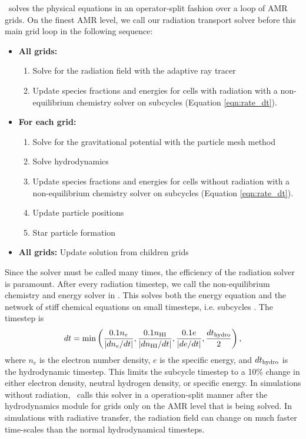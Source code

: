 \documentclass[useAMS,usenatbib]{mn2e}
\begin{document}
\enzo~solves the physical equations in an operator-split fashion over
a loop of AMR grids.  On the finest AMR level, we call our radiation
transport solver before this main grid loop in the following sequence:
\begin{itemize}
\item \textbf{All grids:}
  \begin{enumerate}
  \item Solve for the radiation field with the adaptive ray tracer
  \item Update species fractions and energies for cells with radiation
    with a non-equilibrium chemistry solver on subcycles (Equation
    \ref{eqn:rate_dt}).
  \end{enumerate}
\item \textbf{For each grid:}
  \begin{enumerate}
  \item Solve for the gravitational potential with the particle mesh
    method
  \item Solve hydrodynamics
  \item Update species fractions and energies for cells without
    radiation with a non-equilibrium chemistry solver on subcycles
    (Equation \ref{eqn:rate_dt}).
  \item Update particle positions
  \item Star particle formation
  \end{enumerate}
\item \textbf{All grids:} Update solution from children grids
\end{itemize}
%

Since the solver must be called many times, the efficiency of the
radiation solver is paramount.  After every radiation timestep, we
call the non-equilibrium chemistry and energy solver in \enzo.  This
solves both the energy equation and the network of stiff chemical
equations on small timesteps, i.e. subcycles \citep{Anninos97}.  The
timestep is
%
\begin{equation}
  \label{eqn:rate_dt}
  dt = \min\left(
    \frac{0.1n_e}{|dn_e/dt|}, 
    \frac{0.1n_{\rm HI}}{|dn_{\rm HI}/dt|}, 
    \frac{0.1e}{|de/dt|}, 
    \frac{dt_{\rm hydro}}{2}\right),
\end{equation}
where $n_e$ is the electron number density, $e$ is the specific
energy, and $dt_{\rm hydro}$ is the hydrodynamic timestep.  This
limits the subcycle timestep to a 10\% change in either electron
density, neutral hydrogen density, or specific energy.  In simulations
without radiation, \enzo~calls this solver in a operation-split manner
after the hydrodynamics module for grids only on the AMR level that is
being solved.  In simulations with radiative transfer, the radiation
field can change on much faster time-scales than the normal
hydrodynamical timesteps.
\end{document}
